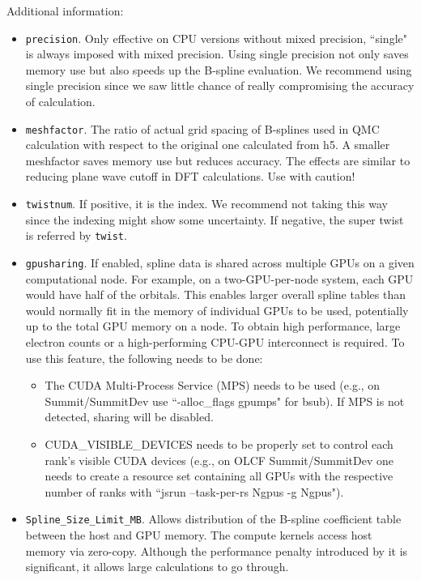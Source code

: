 Additional information:
\begin{itemize}
\item \texttt{precision}. Only effective on CPU versions without mixed precision, ``single" is always imposed with mixed precision. Using single precision not only saves memory use but also speeds up the B-spline evaluation. We recommend using single precision since we saw little chance of really compromising the accuracy of calculation.
\item \texttt{meshfactor}. The ratio of actual grid spacing of B-splines used in QMC calculation with respect to the original one calculated from h5. A smaller meshfactor saves memory use but reduces accuracy. The effects are similar to reducing plane wave cutoff in DFT calculations. Use with caution! 
\item \texttt{twistnum}. If positive, it is the index. We recommend not taking this way since the indexing might show some uncertainty. If negative, the super twist is referred by \texttt{twist}.
\item \texttt{gpusharing}. If enabled, spline data is shared across multiple GPUs on a given computational node. For example, on a
two-GPU-per-node system, each GPU would have half of the
orbitals. This enables larger overall spline tables than would normally fit in
the memory of individual GPUs to be used,  potentially up to
the total GPU memory on a node. To obtain high performance, large
electron counts or a high-performing CPU-GPU interconnect is required.
To use this feature, the following needs to be done:
\begin{itemize}
    \item The CUDA Multi-Process Service (MPS) needs to be used
      (e.g., on Summit/SummitDev use ``-alloc\_flags gpumps" for
      bsub). If MPS is not detected, sharing will be disabled.
    \item CUDA\_VISIBLE\_DEVICES needs to be properly set to control each
      rank's visible CUDA devices (e.g., on OLCF Summit/SummitDev one
      needs to create a resource set containing all GPUs with the
      respective number of ranks with ``jsrun --task-per-rs Ngpus -g
      Ngpus").
\end{itemize}
\item \texttt{Spline\_Size\_Limit\_MB}. Allows distribution of the B-spline coefficient table between the host and GPU memory. The compute kernels access host memory via zero-copy. Although the performance penalty introduced by it is significant, it allows large calculations to go through.
\end{itemize}
